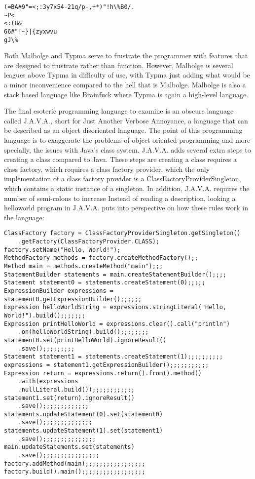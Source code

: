 \documentclass[10pt,twocolumn]{article}
\begin{document}
\begin{lstlisting}
(=BA#9"=<;:3y7x54-21q/p-,+*)"!h\%B0/.
~P<
<:(8&
66#"!~}|{zyxwvu
gJ\%
\end{lstlisting}

Both Malbolge and Typma serve to frustrate the programmer with features that are designed to frustrate rather than function. However, Malbolge is several leagues above Typma in difficulty of use, with Typma just adding what would be a minor inconvenience compared to the hell that is Malbolge. Malbolge is also a stack based language like Brainfuck where Typma is again a high-level language.

The final esoteric programming language to examine is an obscure language called J.A.V.A., short for Just Another Verbose Annoyance, a language that can be described as an object disoriented language. The point of this programming language is to exaggerate the problems of object-oriented programming and more specially, the issues with Java's class system. J.A.V.A. adds several extra steps to creating a class compared to Java. These steps are creating a class requires a class factory, which requires a class factory provider, which the only implementation of a class factory provider is a ClassFactoryProviderSingleton, which contains a static instance of a singleton. In addition, J.A.V.A. requires the number of semi-colons to increase Instead of reading a description, looking a helloworld program in J.A.V.A. puts into perspective on how these rules work in the language:

\begin{lstlisting}
ClassFactory factory = ClassFactoryProviderSingleton.getSingleton()
    .getFactory(ClassFactoryProvider.CLASS);
factory.setName("Hello, World!");
MethodFactory methods = factory.createMethodFactory();;
Method main = methods.createMethod("main");;;
StatementBuilder statements = main.createStatementBuilder();;;;
Statement statement0 = statements.createStatement(0);;;;;
ExpressionBuilder expressions = statement0.getExpressionBuilder();;;;;;
Expression helloWorldString = expressions.stringLiteral("Hello, World!").build();;;;;;;
Expression printHelloWorld = expressions.clear().call("println")
    .on(helloWorldString).build();;;;;;;;
statement0.set(printHelloWorld).ignoreResult()
    .save();;;;;;;;;
Statement statement1 = statements.createStatement(1);;;;;;;;;;
expressions = statement1.getExpressionBuilder();;;;;;;;;;;
Expression return = expressions.return().from().method()
    .with(expressions
    .nullLiteral.build());;;;;;;;;;;;
statement1.set(return).ignoreResult()
    .save();;;;;;;;;;;;;
statements.updateStatement(0).set(statement0)
    .save();;;;;;;;;;;;;;
statements.updateStatement(1).set(statement1)
    .save();;;;;;;;;;;;;;;
main.updateStatements.set(statements)
    .save();;;;;;;;;;;;;;;;
factory.addMethod(main);;;;;;;;;;;;;;;;;
factory.build().main();;;;;;;;;;;;;;;;;;
\end{lstlisting}
   
\end{document}
